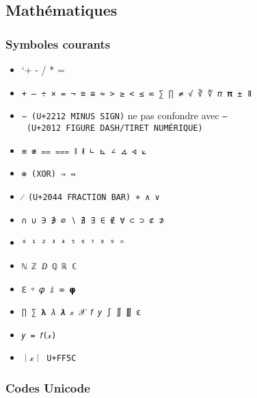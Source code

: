 \documentclass[
  a4paper,
]{book}
\providecommand{\tightlist}{%
  \setlength{\itemsep}{0pt}\setlength{\parskip}{0pt}}
\begin{document}
\hypertarget{mathuxe9matiques}{%
\subsection{Mathématiques}\label{mathuxe9matiques}}

\hypertarget{symboles-courants}{%
\subsubsection{Symboles courants}\label{symboles-courants}}

\begin{itemize}
\tightlist
\item
  `+ - / * =
\item
  \texttt{+\ ‒\ ÷\ ×\ =\ ¬\ ≊\ ≅\ ≈\ \textgreater{}\ ≥\ \textless{}\ ≤\ ∞\ ∑\ ∏\ ≠\ √\ ∛\ ∜\ 𝜋\ 𝛑\ ±\ ǁ}
\item
  \texttt{−\ (U+2212\ MINUS\ SIGN)} ne pas confondre avec \texttt{‒\ (U+2012\ FIGURE\ DASH/TIRET\ NUMÉRIQUE)}
\item
  \texttt{≡\ ≢\ ⩵\ ⩶\ ∥\ ∦\ ∟\ ⊾\ ∠\ ∡\ ∢\ ⟀}
\item
  \texttt{⊕\ (XOR)\ ⇒\ ⇔}
\item
  \texttt{⁄\ (U+2044\ FRACTION\ BAR)\ ⌖\ ∧\ ∨}
\item
  \texttt{∩\ ∪\ ∋\ ∌\ ∅\ ∖\ ∄\ ∃\ ∈\ ∉\ ∀\ ⊂\ ⊃\ ⊄\ ⊅}
\item
  \texttt{⁰\ ¹\ ²\ ³\ ⁴\ ⁵\ ⁶\ ⁷\ ⁸\ ⁹\ ⁿ}
\item
  \texttt{ℕ\ ℤ\ ⅅ\ ℚ\ ℝ\ ℂ}
\item
  \texttt{ℇ\ ᵠ\ 𝜑\ ⅈ\ ∞\ 𝞅}
\item
  \texttt{∏\ ∑\ 𝛌\ 𝜆\ 𝝀\ 𝓍\ 𝒳\ 𝑓\ 𝑦\ ∫\ ∬\ ∭\ ε\ \textbar{}}
\item
  \texttt{𝑦\ =\ 𝑓(𝓍)}
\item
  \texttt{｜𝓍｜\ U+FF5C}
\end{itemize}

\hypertarget{codes-unicode}{%
\subsubsection{Codes Unicode}\label{codes-unicode}}
\end{document}
